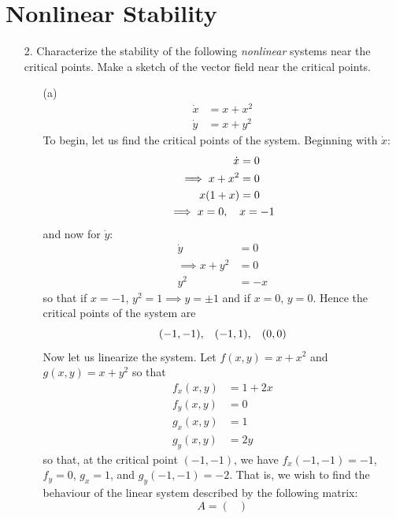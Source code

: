 \documentclass{article}
\begin{document}
\section*{Nonlinear Stability}
\begin{itemize}
    \item[2.] Characterize the stability of the following \textit{nonlinear} systems near the critical points. Make a sketch of the vector field near the critical points.
    \begin{itemize}
        \item[(a)] 
        \begin{align*}
            \dot{x} &= x + x^2\\
            \dot{y} &= x + y^2
        \end{align*}
        To begin, let us find the critical points of the system. Beginning with $\dot{x}$:
        \begin{align*}
            \dot{x} &= 0\\
            \implies x + x^2 &= 0\\
            x(1 + x) &= 0\\
            \implies x = 0, \hspace{0.4cm} &x = -1
        \end{align*}
        and now for $\dot{y}$:
        \begin{align*}
            \dot{y} &= 0\\
            \implies x + y^2 &= 0\\
            y^2 &= -x
        \end{align*}
        so that if $x = -1$, $y^2 = 1 \implies y = \pm 1$ and if $x = 0$, $y = 0$. Hence the critical points of the system are 
        \[(-1,-1), \hspace{0.3cm} (-1,1), \hspace{0.3cm} (0,0) \]
        Now let us linearize the system. Let $f(x,y) = x + x^2$ and $g(x,y) = x + y^2$ so that 
        \begin{align*}
            f_x(x,y) &= 1 + 2x\\
            f_y(x,y) &= 0\\
            g_x(x,y) &= 1\\
            g_y(x,y) &= 2y
        \end{align*}
        so that, at the critical point $(-1,-1)$, we have $f_x(-1,-1) = -1$, $f_y = 0$, $g_x = 1$, and $g_y(-1,-1) = -2$. That is, we wish to find the behaviour of the linear system described by the following matrix:
        \[A = \begin{pmatrix}

\end{pmatrix}\]
\end{itemize}
\end{itemize}
\end{document}
